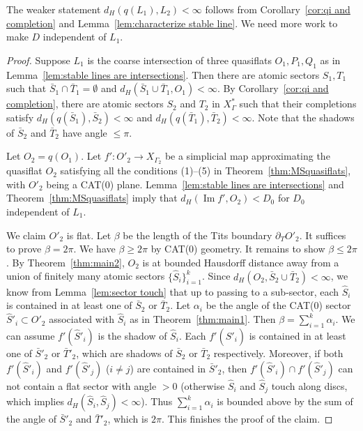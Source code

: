 \documentclass[11pt]{amsart}
\theoremstyle{definition}
\newcommand{\Xa}{X^{\ast}}
\newcommand{\im}{\operatorname{Im}}
\begin{document}
The weaker statement $d_H(q(L_1),L_2)<\infty$ follows from Corollary~\ref{cor:qi and completion} and Lemma~\ref{lem:characterize stable line}. We need more work to make $D$ independent of $L_1$.
\begin{proof}
Suppose $L_1$ is the coarse intersection of three quasiflats $O_1,P_1,Q_1$ as in Lemma~\ref{lem:stable lines are intersections}. Then there are atomic sectors $S_1,T_1$ such that $\bar S_1\cap \bar T_1=\emptyset$ and $d_H(\bar S_1\cup \bar T_1, O_1)<\infty$. By Corollary~\ref{cor:qi and completion}, there are atomic sectors $ S_2$ and $ T_2$ in $\Xa_{\Gamma}$ such that their completions satisfy $d_H(q(\bar S_1),\bar S_2)<\infty$ and $d_H(q(\bar T_1),\bar T_2)<\infty$. Note that the shadows of $\bar S_2$ and $\bar T_2$ have angle $\le \pi$. 

Let $O_2=q(O_1)$. Let $f'\colon O'_2\to X_{\Gamma_2}$ be a simplicial map approximating the quasiflat $O_2$ satisfying all the conditions (1)--(5) in Theorem~\ref{thm:MSquasiflats}, with $O'_2$ being a CAT(0) plane. Lemma~\ref{lem:stable lines are intersections} and Theorem~\ref{thm:MSquasiflats} imply that $d_H(\im f', O_2)<D_0$ for $D_0$ independent of $L_1$. 

We claim $O'_2$ is flat. Let $\beta$ be the length of the Tits boundary $\partial_{T}O'_2$. It suffices to prove $\beta=2\pi$. We have $\beta\ge 2\pi$ by CAT(0) geometry. It remains to show $\beta\le 2\pi$. By Theorem~\ref{thm:main2}, $O_2$ is at bounded Hausdorff distance away from a union of finitely many atomic sectors $\{\widehat S_i\}_{i=1}^k$. Since $d_H(O_2,\bar S_2\cup \bar T_2)<\infty$, we know from Lemma~\ref{lem:sector touch} that up to passing to a sub-sector, each $\widehat S_i$ is contained in at least one of $\bar S_2$ or $\bar T_2$. Let $\alpha_i$ be the angle of the CAT(0) sector $\widehat S'_i\subset O'_2$ associated with $\widehat S_i$ as in Theorem~\ref{thm:main1}. Then $\beta=\sum_{i=1}^k \alpha_i$. We can assume $f'(\widehat S'_i)$ is the shadow of $\widehat S_i$. Each $f'(\widehat S'_i)$ is contained in at least one of $\bar S'_2$ or $\bar T'_2$, which are shadows of $\bar S_2$ or $\bar T_2$ respectively. Moreover, if both $f'(\widehat S'_i)$ and $f'(\widehat S'_j)$ ($i\neq j$) are contained in $\bar S'_2$, then $f'(\widehat S'_i)\cap f'(\widehat S'_j)$ can not contain a flat sector with angle $>0$ (otherwise $\widehat S_i$ and $\widehat S_j$ touch along discs, which implies $d_H(\widehat S_i,\widehat S_j)<\infty$). Thus $\sum_{i=1}^k \alpha_i$ is bounded above by the sum of the angle of $\bar S'_2$ and $\bar T'_2$, which is $2\pi$. This finishes the proof of the claim.


\end{proof}
\end{document}

